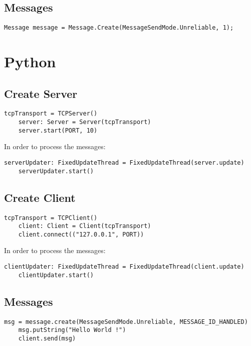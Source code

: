 \subsection{Messages}

\begin{lstlisting}[style=CSharp]
Message message = Message.Create(MessageSendMode.Unreliable, 1);
\end{lstlisting}

\section{Python}

\subsection{Create Server}

\begin{lstlisting}[style=Python]
    tcpTransport = TCPServer()
    server: Server = Server(tcpTransport)
    server.start(PORT, 10)
\end{lstlisting}

In order to process the messages:

\begin{lstlisting}[style=Python]
    serverUpdater: FixedUpdateThread = FixedUpdateThread(server.update)
    serverUpdater.start()
\end{lstlisting}

\subsection{Create Client}

\begin{lstlisting}[style=Python]
    tcpTransport = TCPClient()
    client: Client = Client(tcpTransport)
    client.connect(("127.0.0.1", PORT))
\end{lstlisting}

In order to process the messages:

\begin{lstlisting}[style=Python]
    clientUpdater: FixedUpdateThread = FixedUpdateThread(client.update)
    clientUpdater.start()
\end{lstlisting}

\subsection{Messages}

\begin{lstlisting}[style=Python]
    msg = message.create(MessageSendMode.Unreliable, MESSAGE_ID_HANDLED)
    msg.putString("Hello World !")
    client.send(msg)
\end{lstlisting}